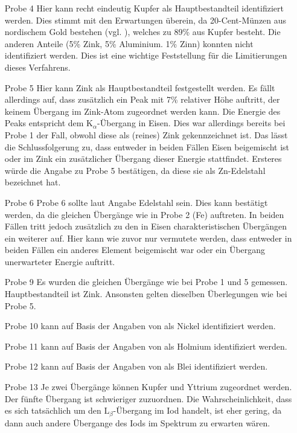\documentclass[
	a4paper,
	12pt,
	pagesize,
	ngerman
]{scrartcl}
\begin{document}
	\begin{enumerate}
		\item[Probe 4] Hier kann recht eindeutig Kupfer als Hauptbestandteil identifiziert werden. Dies stimmt mit den Erwartungen überein, da 20-Cent-Münzen aus nordischem Gold bestehen (vgl. \cite{muenzen}), welches zu 89\% aus Kupfer besteht. Die anderen Anteile (5\% Zink, 5\% Aluminium. 1\% Zinn) konnten nicht identifiziert werden. Dies ist eine wichtige Feststellung für die Limitierungen dieses Verfahrens.
		\item[Probe 5] Hier kann Zink als Hauptbestandteil festgestellt werden. Es fällt allerdings auf, dass zusätzlich ein Peak mit 7\% relativer Höhe auftritt, der keinem Übergang im Zink-Atom zugeordnet werden kann. Die Energie des Peaks entspricht dem $\text{K}_\alpha$-Übergang in Eisen. Dies war allerdings bereits bei Probe 1 der Fall, obwohl diese als (reines) Zink gekennzeichnet ist. Das lässt die Schlussfolgerung zu, dass entweder in beiden Fällen Eisen beigemischt ist oder im Zink ein zusätzlicher Übergang dieser Energie stattfindet. Ersteres würde die Angabe zu Probe 5 bestätigen, da diese sie als Zn-Edelstahl bezeichnet hat.
		\item[Probe 6] Probe 6 sollte laut Angabe Edelstahl sein. Dies kann bestätigt werden, da die gleichen Übergänge wie in Probe 2 (Fe) auftreten. In beiden Fällen tritt jedoch zusätzlich zu den in Eisen charakteristischen Übergängen ein weiterer auf. Hier kann wie zuvor nur vermutete werden, dass entweder in beiden Fällen ein anderes Element beigemischt war oder ein Übergang unerwarteter Energie auftritt.
		\item[Probe 9] Es wurden die gleichen Übergänge wie bei Probe 1 und 5 gemessen. Hauptbestandteil ist Zink. Ansonsten gelten dieselben Überlegungen wie bei Probe 5.
		\item[Probe 10] kann auf Basis der Angaben von \cite{XRAYDB} als Nickel identifiziert werden.
		\item[Probe 11] kann auf Basis der Angaben von \cite{XRAYDB} als Holmium identifiziert werden.
		\item[Probe 12] kann auf Basis der Angaben von \cite{XRAYDB} als Blei identifiziert werden.
		\item[Probe 13] Je zwei Übergänge können Kupfer und Yttrium zugeordnet werden. Der fünfte Übergang ist schwieriger zuzuordnen. Die Wahrscheinlichkeit, dass es sich tatsächlich um den $\text{L}_\beta$-Übergang im Iod handelt, ist eher gering, da dann auch andere Übergange des Iods im Spektrum zu erwarten wären.

\end{enumerate}
\end{document}

